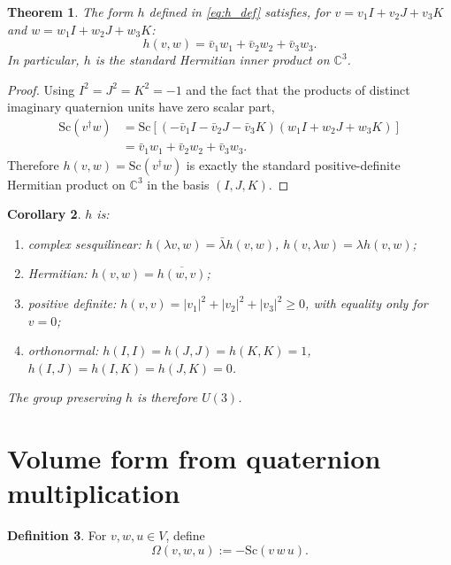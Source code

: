 \documentclass[12pt,a4paper]{article}
\newtheorem{theorem}{Theorem}[section]
\newtheorem{corollary}[theorem]{Corollary}
\theoremstyle{definition}
\newtheorem{definition}[theorem]{Definition}
\theoremstyle{remark}
\begin{document}
\begin{theorem}\label{thm:hermitian}
The form $h$ defined in \eqref{eq:h_def} satisfies, for
$v=v_1 I+v_2 J+v_3 K$ and $w=w_1 I+w_2 J+w_3 K$:
\begin{equation}\label{eq:h_explicit}
  h(v,w) = \bar{v}_1 w_1 + \bar{v}_2 w_2 + \bar{v}_3 w_3.
\end{equation}
In particular, $h$ is the standard Hermitian inner product on $\mathbb{C}^3$.
\end{theorem}

\begin{proof}
Using $I^2=J^2=K^2=-1$ and the fact that the products of distinct imaginary
quaternion units have zero scalar part,
\begin{align}
  \mathrm{Sc}(v^\dagger w)
  &= \mathrm{Sc}\!\left[
     (-\bar v_1 I-\bar v_2 J-\bar v_3 K)
     (w_1 I+w_2 J+w_3 K)\right] \\
  &= \bar v_1 w_1+\bar v_2 w_2+\bar v_3 w_3.
\end{align}
Therefore $h(v,w)=\mathrm{Sc}(v^\dagger w)$ is exactly the standard
positive-definite Hermitian product on $\mathbb{C}^3$ in the basis $(I,J,K)$.
\end{proof}

\begin{corollary}
$h$ is:
\begin{enumerate}
  \item \emph{complex sesquilinear}: $h(\lambda v,w)=\bar\lambda h(v,w)$,
        $h(v,\lambda w)=\lambda h(v,w)$;
  \item \emph{Hermitian}: $h(v,w)=\overline{h(w,v)}$;
  \item \emph{positive definite}: $h(v,v)=|v_1|^2+|v_2|^2+|v_3|^2\geq 0$,
        with equality only for $v=0$;
  \item \emph{orthonormal}: $h(I,I)=h(J,J)=h(K,K)=1$,
        $h(I,J)=h(I,K)=h(J,K)=0$.
\end{enumerate}
The group preserving $h$ is therefore $U(3)$.
\end{corollary}

\section{Volume form from quaternion multiplication}
\label{sec:volume}

\begin{definition}\label{def:Omega}
For $v,w,u\in V$, define
\begin{equation}\label{eq:Omega_def}
  \Omega(v,w,u) := -\mathrm{Sc}(v\,w\,u).
\end{equation}
\end{definition}
\end{document}
